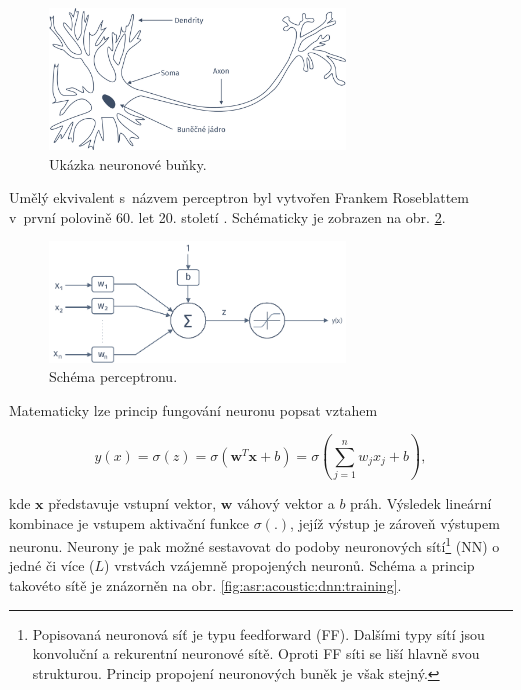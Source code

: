 \begin{figure}[hbpt]
  \centering
  \includegraphics[width=0.7\textwidth]{./ch4-asr/img/neuron-human.pdf}
  \caption{Ukázka neuronové buňky.}
  \label{fig:asr:acoustic:dnn:neuron:human}
\end{figure}

\noindent Umělý ekvivalent s~názvem perceptron byl vytvořen Frankem Roseblattem v~první polovině 60. let 20. století \cite{Rosenblatt1962}. Schématicky je zobrazen na obr. \ref{fig:asr:acoustic:dnn:neuron:artificial}.

\begin{figure}[hbpt]
  \centering
  \includegraphics[width=0.7\textwidth]{./ch4-asr/img/neuron.pdf}
  \caption{Schéma perceptronu.}
  \label{fig:asr:acoustic:dnn:neuron:artificial}
\end{figure}

\noindent Matematicky lze princip fungování neuronu popsat vztahem

\begin{equation}
  y\left(x\right) = \sigma\left(z\right) = \sigma \left(\boldsymbol{w}^{T}\boldsymbol{x} + b\right) = \sigma \left( \sum_{j=1}^{n} w_{j}x_{j} + b\right),
   \label{eq:asr:acoustic:dnn:neuron:output}
 \end{equation}

\noindent kde $\boldsymbol{x}$ představuje vstupní vektor, $\boldsymbol{w}$ váhový vektor a $b$ práh. Výsledek lineární kombinace je vstupem aktivační funkce $\sigma\left(.\right)$, jejíž výstup je zároveň výstupem neuronu. Neurony je pak možné sestavovat do podoby neuronových sítí\footnote{Popisovaná neuronová síť je typu feedforward (FF). Dalšími typy sítí jsou konvoluční a rekurentní neuronové sítě. Oproti FF síti se liší hlavně svou strukturou. Princip propojení neuronových buněk je však stejný.} (NN) o jedné či více ($L$) vrstvách vzájemně propojených neuronů. Schéma a princip takovéto sítě je znázorněn na obr. \ref{fig:asr:acoustic:dnn:training}.

